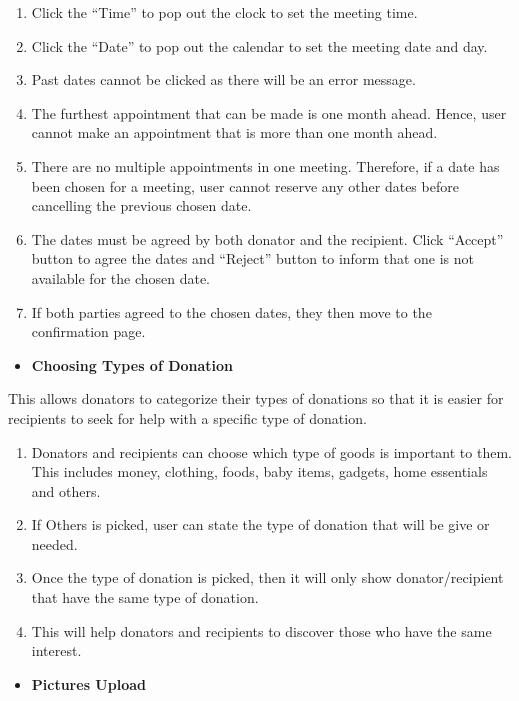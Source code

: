 \documentclass[conference]{IEEEtran}
\begin{document}
\begin{enumerate}
\item  Click the “Time” to pop out the clock to set the meeting time.
\item  Click the “Date” to pop out the calendar to set the meeting date and day.
\item  Past dates cannot be clicked as there will be an error message.
\item  The furthest appointment that can be made is one month ahead. Hence, user cannot make an appointment that is more than one month ahead.
\item There are no multiple appointments in one meeting. Therefore, if a date has been chosen for a meeting, user cannot reserve any other dates before cancelling the previous chosen date.
\item The dates must be agreed by both donator and the recipient. Click “Accept” button to agree the dates and “Reject” button to inform that one is not available for the chosen date.
\item  If both parties agreed to the chosen dates, they then move to the confirmation page. \\
\end{enumerate}
\begin{itemize}
\item \textbf{Choosing Types of Donation}
\end{itemize}
\par This allows donators to categorize their types of donations so that it is easier for recipients to seek for help with a specific type of donation.
\begin{enumerate}
\item Donators and recipients can choose which type of goods is important to them. This includes money, clothing, foods, baby items, gadgets, home essentials and others. 
\item  If Others is picked, user can state the type of donation that will be give or needed. 
\item Once the type of donation is picked, then it will only show donator/recipient that have the same type of donation. 
\item This will help donators and recipients to discover those who have the same interest. \\
\end{enumerate}
\begin{itemize}
\item \textbf{Pictures Upload}
\end{itemize}
\end{document}
